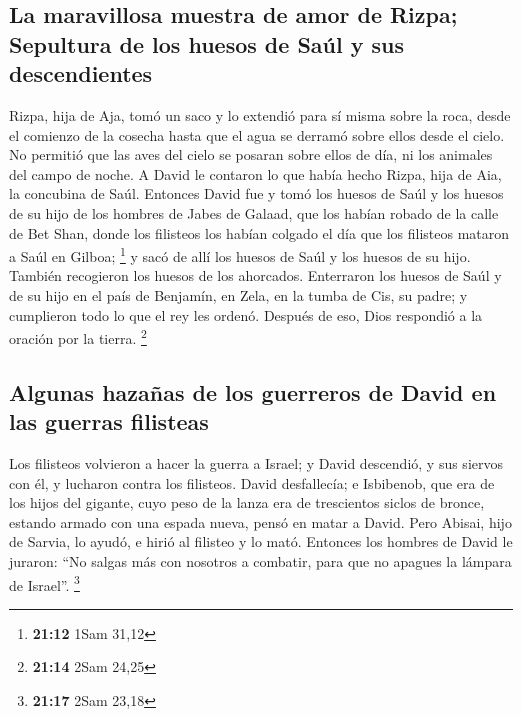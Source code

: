 \hypertarget{la-maravillosa-muestra-de-amor-de-rizpa-sepultura-de-los-huesos-de-sauxfal-y-sus-descendientes}{%
\subsection{La maravillosa muestra de amor de Rizpa; Sepultura de los
huesos de Saúl y sus
descendientes}\label{la-maravillosa-muestra-de-amor-de-rizpa-sepultura-de-los-huesos-de-sauxfal-y-sus-descendientes}}

 Rizpa, hija de Aja, tomó un saco y lo extendió para sí
misma sobre la roca, desde el comienzo de la cosecha hasta que el agua
se derramó sobre ellos desde el cielo. No permitió que las aves del
cielo se posaran sobre ellos de día, ni los animales del campo de noche.
 A David le contaron lo que había hecho Rizpa, hija de
Aia, la concubina de Saúl.  Entonces David fue y tomó los
huesos de Saúl y los huesos de su hijo de los hombres de Jabes de
Galaad, que los habían robado de la calle de Bet Shan, donde los
filisteos los habían colgado el día que los filisteos mataron a Saúl en
Gilboa; \footnote{\textbf{21:12} 1Sam 31,12}  y sacó de
allí los huesos de Saúl y los huesos de su hijo. También recogieron los
huesos de los ahorcados.  Enterraron los huesos de Saúl y
de su hijo en el país de Benjamín, en Zela, en la tumba de Cis, su
padre; y cumplieron todo lo que el rey les ordenó. Después de eso, Dios
respondió a la oración por la tierra. \footnote{\textbf{21:14} 2Sam
  24,25}

\hypertarget{algunas-hazauxf1as-de-los-guerreros-de-david-en-las-guerras-filisteas}{%
\subsection{Algunas hazañas de los guerreros de David en las guerras
filisteas}\label{algunas-hazauxf1as-de-los-guerreros-de-david-en-las-guerras-filisteas}}

 Los filisteos volvieron a hacer la guerra a Israel; y
David descendió, y sus siervos con él, y lucharon contra los filisteos.
David desfallecía;  e Isbibenob, que era de los hijos del
gigante, cuyo peso de la lanza era de trescientos siclos de bronce,
estando armado con una espada nueva, pensó en matar a David.
 Pero Abisai, hijo de Sarvia, lo ayudó, e hirió al
filisteo y lo mató. Entonces los hombres de David le juraron: ``No
salgas más con nosotros a combatir, para que no apagues la lámpara de
Israel''. \footnote{\textbf{21:17} 2Sam 23,18}

